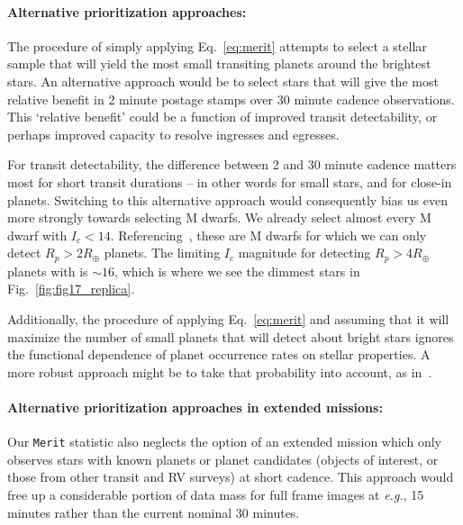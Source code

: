 \paragraph{Alternative prioritization approaches:}
The procedure of simply applying Eq.~\ref{eq:merit} attempts to select a stellar sample that will yield the most small transiting planets around the brightest stars.
An alternative approach would be to select stars that will give the most relative benefit in 2 minute postage stamps over 30 minute cadence observations.
This `relative benefit' could be a function of improved transit detectability, or perhaps improved capacity to resolve ingresses and egresses.

For transit detectability, the difference between 2 and 30 minute cadence matters most for short transit durations -- in other words for small stars, and for close-in planets.
Switching to this alternative approach would consequently bias us even more strongly towards selecting M dwarfs.
We already select almost every M dwarf with $I_c < 14$. 
Referencing~\citet{winn_searchable_2013}, these are M dwarfs for which we can only detect $R_p > 2R_\oplus$ planets.
The limiting $I_c$ magnitude for detecting $R_p > 4R_\oplus$ planets with \tess is $\sim 16$, which is where we see the dimmest stars in Fig.~\ref{fig:fig17_replica}.

Additionally, the procedure of applying Eq.~\ref{eq:merit} and assuming that it will maximize the number of small planets that \tess will detect about bright stars ignores the functional dependence of planet occurrence rates on stellar properties.
A more robust approach might be to take that probability into account, as in~\citet{kipping_transit_2016}.


\paragraph{Alternative prioritization approaches in extended missions:}
Our \texttt{Merit} statistic also neglects the option of an extended mission which only observes stars with known planets or planet candidates (\tesss objects of interest, or those from other transit and RV surveys) at short cadence.
This approach would free up a considerable portion of \tesss data mass for full frame images at \textit{e.g.}, 15 minutes rather than the current nominal 30 minutes.

